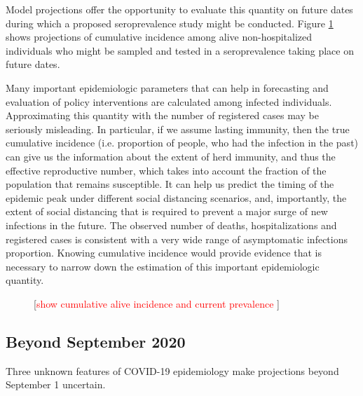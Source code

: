 \documentclass[11pt]{article}
\newcommand{\comment}[1]{[\textcolor{red}{#1}]}
\begin{document}
Model projections offer the opportunity to evaluate this quantity on future dates during which a proposed seroprevalence study might be conducted.  Figure \ref{fig:cumincidence} shows projections of cumulative incidence among alive non-hospitalized individuals who might be sampled and tested in a seroprevalence taking place on future dates.  

Many important epidemiologic parameters that can help in forecasting and evaluation of policy interventions are calculated among infected individuals. Approximating this quantity with the number of registered cases may be seriously misleading. In particular, if we assume lasting immunity, then the true cumulative incidence (i.e. proportion of people, who had the infection in the past) can give us the information about the extent of herd immunity, and thus the effective reproductive number, which takes into account the fraction of the population that remains susceptible. It can help us predict the timing of the epidemic peak under different social distancing scenarios, and, importantly, the extent of social distancing that is required to prevent a major surge of new infections in the future. The observed number of deaths, hospitalizations and registered cases is consistent with a very wide range of asymptomatic infections proportion. Knowing cumulative incidence would provide evidence that is necessary to narrow down the estimation of this important epidemiologic quantity. 



\begin{figure}
\centering
\caption{\comment{show cumulative alive incidence and current prevalence }}
\label{fig:cumincidence}
\end{figure}





\subsection*{Beyond September 2020}

Three unknown features of COVID-19 epidemiology make projections beyond September 1 uncertain. 
\end{document}
